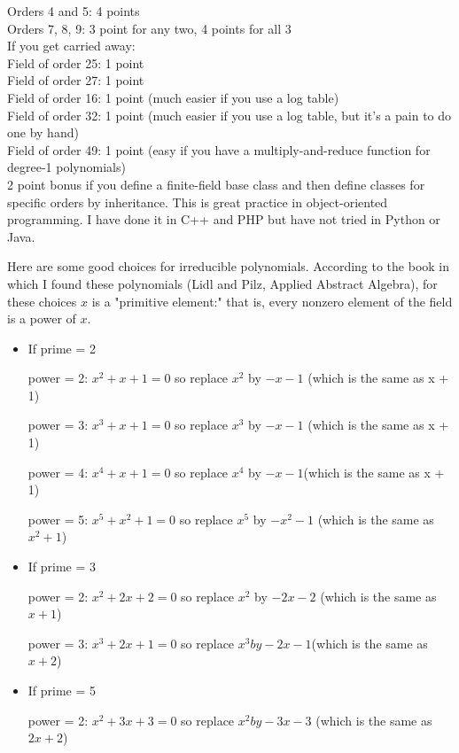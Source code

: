 \documentclass[12pt]{article}
\begin{document}
\begin{enumerate}
Orders 4 and 5: 4 points\\
Orders 7, 8, 9:  3 point for any two, 4 points for all 3\\
If you get carried away:\\
Field of order 25: 1 point\\
Field of order 27: 1 point\\
Field of order 16: 1 point (much easier if you use a log table)\\
Field of order 32: 1 point (much easier if you use a log table, but it's a pain to do one by hand)\\
Field of order 49: 1 point (easy if you have a multiply-and-reduce function for degree-1 polynomials)\\
2 point bonus if you define a finite-field base class and then define classes for specific orders by inheritance. This is great practice in object-oriented programming. I have done it in C++ and PHP but have not tried in Python or Java.

\pagebreak
Here are some good choices for irreducible polynomials. According to the book in which I found these polynomials (Lidl and Pilz, Applied Abstract Algebra), for these choices $x$ is a "primitive element:" that is, every nonzero element of the field is a power of $x$.
\begin{itemize}
\item If prime = 2

power = 2:   $x^2 + x + 1 = 0$    so replace $x^2$ by $-x -1$ (which is the same as x + 1)

power = 3:   $x^3 + x + 1 = 0$    so replace $x^3$ by $-x -1$ (which is the same as x + 1)

power = 4:   $x^4 + x + 1 = 0$    so replace $x^4$ by $-x -1$(which is the same as x + 1)

power = 5:   $x^5 + x^2 + 1 = 0$    so replace $x^5$ by $-x^2 -1$ (which is the same as $x^2 + 1$)


\item If prime = 3

power = 2:   $x^2 + 2x + 2 = 0$    so replace $x^2$ by $-2x - 2$ (which is the same as $x + 1$)

power = 3:   $x^3 + 2x + 1 = 0$    so replace $x^3 by -2x -1$(which is the same as $x + 2$)

\item If prime = 5

power = 2:   $x^2 + 3x + 3 = 0$    so replace $x^2 by -3x -3$ (which is the same as $2x + 2$)


\end{itemize}
\end{enumerate}
\end{document}
